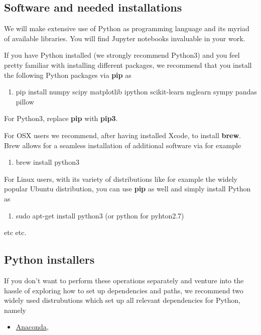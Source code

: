 \documentclass[%
oneside,                 %
final,                   %
10pt]{article}
\begin{document}
\subsection*{Software and needed installations}

We will make extensive use of Python as programming language and its
myriad of available libraries.  You will find
Jupyter notebooks invaluable in your work.

If you have Python installed (we strongly recommend Python3) and you feel
pretty familiar with installing different packages, we recommend that
you install the following Python packages via \textbf{pip} as 

\begin{enumerate}
\item pip install numpy scipy matplotlib ipython scikit-learn mglearn sympy pandas pillow 
\end{enumerate}

\noindent
For Python3, replace \textbf{pip} with \textbf{pip3}.

For OSX users we recommend, after having installed Xcode, to
install \textbf{brew}. Brew allows for a seamless installation of additional
software via for example 

\begin{enumerate}
\item brew install python3
\end{enumerate}

\noindent
For Linux users, with its variety of distributions like for example the widely popular Ubuntu distribution,
you can use \textbf{pip} as well and simply install Python as 

\begin{enumerate}
\item sudo apt-get install python3  (or python for pyhton2.7)
\end{enumerate}

\noindent
etc etc. 

\subsection*{Python installers}

If you don't want to perform these operations separately and venture
into the hassle of exploring how to set up dependencies and paths, we
recommend two widely used distrubutions which set up all relevant
dependencies for Python, namely 

\begin{itemize}
\item \href{{https://docs.anaconda.com/}}{Anaconda}, 
\end{itemize}
\end{document}
